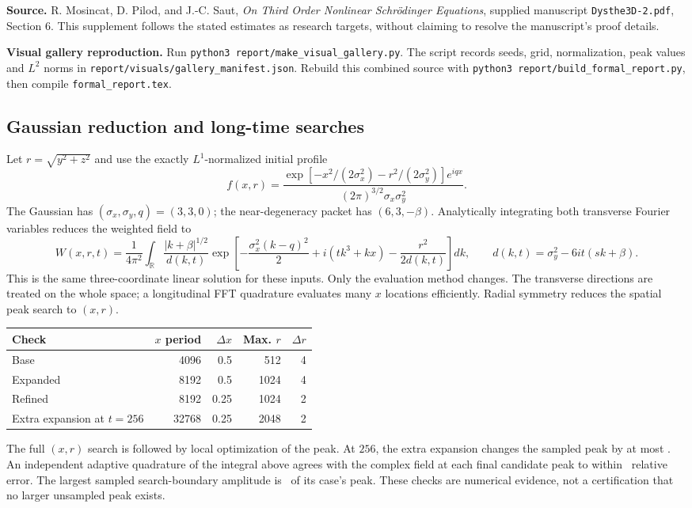 \documentclass[10pt,letterpaper]{article}
\numberwithin{equation}{section}
\begin{document}
\textbf{Source.} R. Mosincat, D. Pilod, and J.-C. Saut,
\emph{On Third Order Nonlinear Schr\"odinger Equations}, supplied manuscript
\texttt{Dysthe3D-2.pdf}, Section 6. This supplement follows the stated estimates
as research targets, without claiming to resolve the manuscript's proof details.

\textbf{Visual gallery reproduction.} Run \texttt{python3 report/make\_visual\_gallery.py}.
The script records seeds, grid, normalization, peak values and $L^2$ norms in
\texttt{report/visuals/gallery\_manifest.json}. Rebuild this combined source with
\texttt{python3 report/build\_formal\_report.py}, then compile \texttt{formal\_report.tex}.

\subsection{Gaussian reduction and long-time searches}\label{longmethods}
Let $r=\sqrt{y^2+z^2}$ and use the exactly $L^1$-normalized initial profile
\begin{equation}
 f(x,r)=\frac{\exp[-x^2/(2\sigma_x^2)-r^2/(2\sigma_y^2)]e^{iqx}}
 {(2\pi)^{3/2}\sigma_x\sigma_y^2}.
\end{equation}
The Gaussian has $(\sigma_x,\sigma_y,q)=(3,3,0)$; the near-degeneracy packet
has $(6,3,-\beta)$. Analytically integrating both transverse Fourier variables
reduces the weighted field to
\begin{equation}
 W(x,r,t)=\frac1{4\pi^2}\int_{\mathbb R}
 \frac{|k+\beta|^{1/2}}{d(k,t)}
 \exp\!\left[-\frac{\sigma_x^2(k-q)^2}{2}+i(tk^3+kx)
             -\frac{r^2}{2d(k,t)}\right]dk,
 \qquad d(k,t)=\sigma_y^2-6it(sk+\beta).
\end{equation}
This is the same three-coordinate linear solution for these inputs. Only the
evaluation method changes. The transverse directions are treated on the whole
space; a longitudinal FFT quadrature evaluates many $x$ locations efficiently.
Radial symmetry reduces the spatial peak search to $(x,r)$.

\begin{center}\begin{tabular}{lrrrr}\toprule
Check & $x$ period & $\Delta x$ & Max. $r$ & $\Delta r$\\\midrule
Base & 4096 & 0.5 & 512 & 4\\
Expanded & 8192 & 0.5 & 1024 & 4\\
Refined & 8192 & 0.25 & 1024 & 2\\
Extra expansion at $t=256$ & 32768 & 0.25 & 2048 & 2\\\bottomrule
\end{tabular}\end{center}
The full $(x,r)$ search is followed by local optimization of the peak. At $256$,
the extra expansion changes the sampled peak by at most \LongDomain. An independent
adaptive quadrature of the integral above agrees with the complex field at each
final candidate peak to within \LongQuad\ relative error. The largest sampled
search-boundary amplitude is \LongEdge\ of its case's peak. These checks are
numerical evidence, not a certification that no larger unsampled peak exists.
\end{document}
